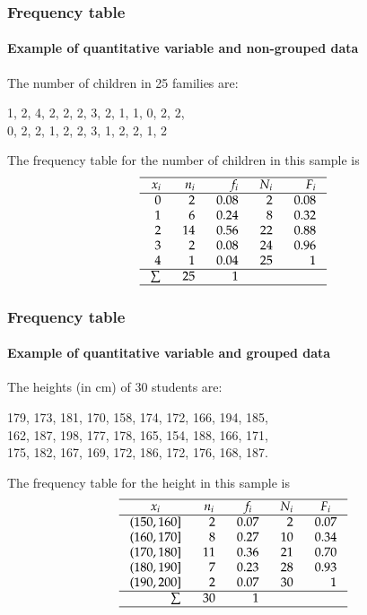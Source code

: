 \begin{frame}
\frametitle{Frequency table}
\framesubtitle{Example of quantitative variable and non-grouped data}
The number of children in 25 families are:
\begin{center}
1, 2, 4, 2, 2, 2, 3, 2, 1, 1, 0, 2, 2, \\
 0, 2, 2, 1, 2, 2, 3, 1, 2, 2, 1, 2
\end{center}
The frequency table for the number of children in this sample is 
\[
\setlength\arraycolsep{3mm}
\setlength\arrayrulewidth{0.5pt}
\begin{array}{rrrrr}
\hline
x_i & n_i & f_i & N_i & F_i\\
\hline
0 & 2 & 0.08 & 2 & 0.08\\
1 & 6 & 0.24 & 8 & 0.32\\
2 & 14 & 0.56 & 22 & 0.88\\
3 & 2  & 0.08 & 24 & 0.96\\
4 & 1 & 0.04 & 25 & 1 \\
\hline
\sum & 25 & 1 \\
\hline
\end{array}
\]
\end{frame}


\begin{frame}
\frametitle{Frequency table}
\framesubtitle{Example of quantitative variable and grouped data}
The heights (in cm) of 30 students are:
\begin{center}
179, 173, 181, 170, 158, 174, 172, 166, 194, 185,\\
162, 187, 198, 177, 178, 165, 154, 188, 166, 171,\\
175, 182, 167, 169, 172, 186, 172, 176, 168, 187.
\end{center}
The frequency table for the height in this sample is
\[
\setlength\arraycolsep{3mm}
\setlength\arrayrulewidth{0.5pt}
\begin{array}{rrrrr}
\hline
\multicolumn{1}{c}{x_i} & \multicolumn{1}{c}{n_i} & \multicolumn{1}{c}{f_i} & \multicolumn{1}{c}{N_i} & \multicolumn{1}{c}{F_i}\\
\hline
(150,160] & 2 & 0.07 & 2 & 0.07\\
(160,170] & 8 & 0.27 & 10 & 0.34\\
(170,180] & 11 & 0.36 & 21 & 0.70\\
(180,190] & 7  & 0.23 & 28 & 0.93\\
(190,200] & 2 & 0.07 & 30 & 1 \\
\hline
\sum & 30 & 1 \\
\hline
\end{array}
\]
\end{frame}


